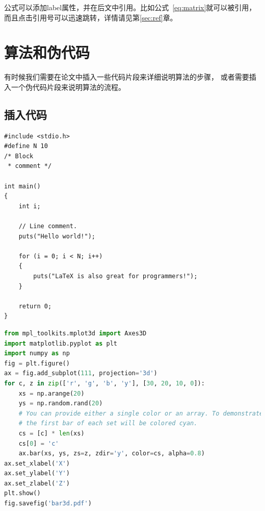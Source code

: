 \documentclass[UTF8]{ctexart}
\numberwithin{equation}{section} %
\numberwithin{table}{section} %
\begin{document}
公式可以添加label属性，并在后文中引用。比如公式~\ref{eq:matrix}就可以被引用，
而且点击引用号可以迅速跳转，详情请见第\ref{sec:ref}章。

\section{算法和伪代码}
有时候我们需要在论文中插入一些代码片段来详细说明算法的步骤，
或者需要插入一个伪代码片段来说明算法的流程。

\subsection{插入代码}
\lstset{escapechar=@,style=customc}

\begin{lstlisting}[caption={一段C语言程序。},captionpos=b]
#include <stdio.h>
#define N 10
/* Block
 * comment */

int main()
{
    int i;

    // Line comment.
    puts("Hello world!");
    
    for (i = 0; i < N; i++)
    {
        puts("LaTeX is also great for programmers!");
    }

    return 0;
}
\end{lstlisting}

\begin{lstlisting}[caption={一段Python语言程序。},captionpos=b,language=Python]
from mpl_toolkits.mplot3d import Axes3D
import matplotlib.pyplot as plt
import numpy as np
fig = plt.figure()
ax = fig.add_subplot(111, projection='3d')
for c, z in zip(['r', 'g', 'b', 'y'], [30, 20, 10, 0]):
    xs = np.arange(20)
    ys = np.random.rand(20)
    # You can provide either a single color or an array. To demonstrate this,
    # the first bar of each set will be colored cyan.
    cs = [c] * len(xs)
    cs[0] = 'c'
    ax.bar(xs, ys, zs=z, zdir='y', color=cs, alpha=0.8)
ax.set_xlabel('X')
ax.set_ylabel('Y')
ax.set_zlabel('Z')
plt.show()
fig.savefig('bar3d.pdf')
\end{lstlisting}
\end{document}
